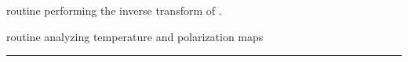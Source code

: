 \begin{related}
  \begin{sulist}{} %
  \item[\htmlref{alm2map\_spin}{sub:alm2map_spin}] routine performing the inverse transform
of \thedocid.
   \item[\htmlref{map2alm}{sub:map2alm}] routine analyzing temperature and
polarization maps
  \end{sulist}
\end{related}

\rule{\hsize}{2mm}

\newpage

